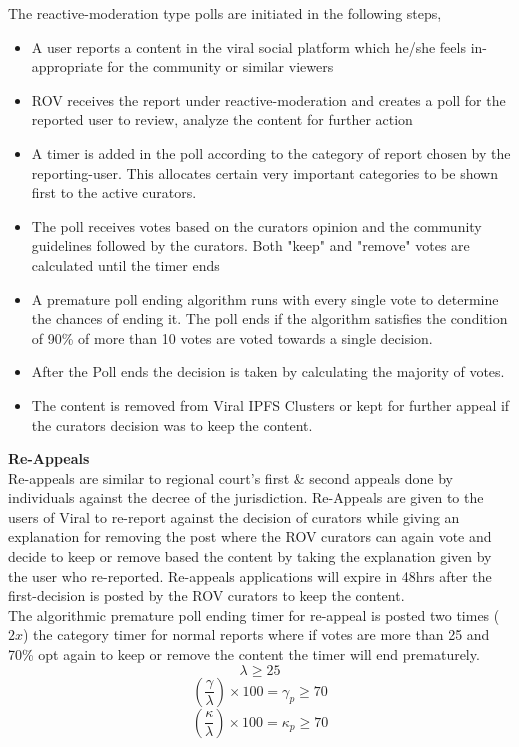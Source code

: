\documentclass[conference]{IEEEtran}
\begin{document}
The reactive-moderation type polls are initiated  in the following steps,
\begin{itemize}[wide, labelwidth=!, labelindent=0pt]
\item A user reports a content in the viral social platform which he/she feels in-appropriate for the community or similar viewers
\item ROV receives the report under reactive-moderation and creates a poll for the reported user to review, analyze the content for further action
\item A timer is added in the poll according to the category of report chosen by the reporting-user.  This allocates certain very important categories to be shown first to the active curators.
\item The poll receives votes based on the curators opinion and the community guidelines followed by the curators. Both "keep" and "remove" votes are calculated until the timer ends
\item A premature poll ending algorithm runs with every single vote to determine the chances of ending it.  The poll ends if the algorithm satisfies the condition of 90\% of more than 10 votes are voted towards a single decision.
\item After the Poll ends the decision is taken by calculating the majority of votes. 
\item The content is removed from Viral IPFS Clusters or kept for further appeal if the curators decision was to keep the content.
\end{itemize}


\textbf{Re-Appeals}\\

Re-appeals are similar to regional court's first \& second appeals done by individuals against the decree of the jurisdiction.  Re-Appeals are given to the users of Viral to re-report against the decision of curators while giving an explanation for removing the post where the ROV curators can again vote and decide to keep or remove based the content by taking the explanation given by the user who re-reported. Re-appeals applications will expire in 48hrs after the first-decision is posted by the ROV curators to keep the content. \\

The algorithmic premature poll ending timer for re-appeal is posted two times ($2x$) the category timer for normal reports where if votes are more than 25 and 70\% opt again to keep or remove the content the timer will end prematurely.\\
\[\lambda \geq25\]
\[(\frac{\gamma}{\lambda}) \times  100 = \gamma_p \geq 70\]
\[(\frac{\kappa}{\lambda}) \times  100 = \kappa_p \geq 70\]
\end{document}
